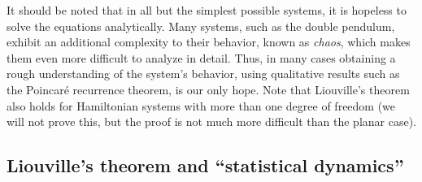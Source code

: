 \documentclass[12pt]{amsart}
\begin{document}
It should be noted that in all but the simplest possible systems, it is hopeless to solve the equations analytically. Many systems, such as the double pendulum, exhibit an additional complexity to their behavior, known as \emph{chaos}, which makes them even more difficult to analyze in detail. Thus, in many cases obtaining a rough understanding of the system's behavior, using qualitative results such as the Poincar\'e recurrence theorem, is our only hope. Note that Liouville's theorem also holds for Hamiltonian systems with more than one degree of freedom (we will not prove this, but the proof is not much more difficult than the planar case).

\subsection{Liouville's theorem and ``statistical dynamics''}
\end{document}
